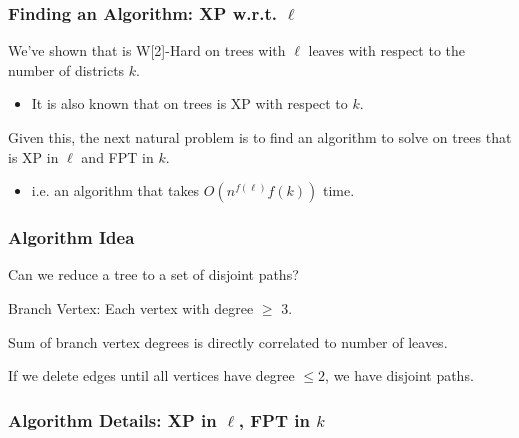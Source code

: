 \begin{frame}
    \frametitle{Finding an Algorithm: XP w.r.t. $\ell$}
    We've shown that \gm is W[2]-Hard on trees with $\ell$ leaves with respect to the number of districts $k$.
    \begin{itemize}
        \item It is also known that \gm on trees is XP with respect to $k$.
    \end{itemize}
    \vspace{1.0cm}
    
    Given this, the next natural problem is to find an algorithm to solve \gm on trees that is XP in $\ell$ and FPT in $k$.
    \begin{itemize}
        \item i.e. an algorithm that takes $O(n^{f(\ell)}f(k))$ time.
    \end{itemize}
\end{frame}

\begin{frame}
    \frametitle{Algorithm Idea}
    Can we reduce a tree to a set of disjoint paths?
    \begin{itemize}
         {
            \item \color{red}Branch Vertex: \color{black} Each vertex with degree $\geq$ 3.
            \item Sum of branch vertex degrees is directly correlated to number of leaves.
        }
         {
            \item If we delete edges until all vertices have degree $\leq 2$, we have disjoint paths.
        }
    \end{itemize}
    \begin{figure}
        \begin{center}
            
        \end{center}
    \end{figure}
\end{frame}

\begin{frame}
    \frametitle{Algorithm Details: XP in $\ell$, FPT in $k$}

    \begin{figure}
		\begin{center}
			
		\end{center}
	\end{figure}

    \begin{figure}
        \begin{center}
             {
                
            }
            \hspace{2.0cm}
             {
                
            }
        \end{center}
    \end{figure}
\end{frame}